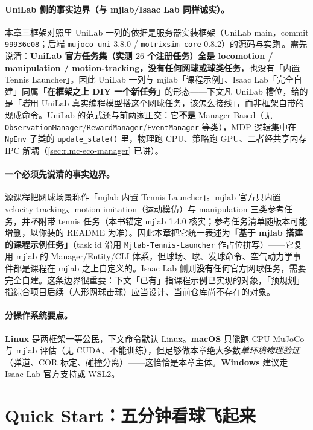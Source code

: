 \paragraph{UniLab 侧的事实边界（与 mjlab/Isaac Lab 同样诚实）。}本章三框架对照里 UniLab 一列的依据是服务器实装框架（UniLab main，commit \texttt{99936e08}；后端 \verb|mujoco-uni| 3.8.0 / \verb|motrixsim-core| 0.8.2）的源码与实跑\,\cite{unilab2026}。需先说清：\textbf{UniLab 官方任务集（实测 $26$ 个注册任务）全是 locomotion / manipulation / motion-tracking，没有任何网球或球类任务}，也没有「内置 Tennis Launcher」。因此 UniLab 一列与 mjlab「课程示例」、Isaac Lab「完全自建」同属\textbf{「在框架之上 DIY 一个新任务」}的形态——下文凡 UniLab 槽位，给的是「\emph{若}用 UniLab 真实编程模型搭这个网球任务，该怎么接线」，而非框架自带的现成命令。UniLab 的范式还与前两家正交：它\textbf{不是} Manager-Based（无 \verb|ObservationManager|/\verb|RewardManager|/\verb|EventManager| 等类），MDP 逻辑集中在 \verb|NpEnv| 子类的 \verb|update_state()| 里，物理跑 CPU、策略跑 GPU、二者经共享内存 IPC 解耦（\cref{sec:rlmc-eco-manager} 已讲）。

\paragraph{一个必须先说清的事实边界。}源课程把网球场景称作「mjlab 内置 Tennis Launcher」。mjlab 官方只内置 velocity tracking、motion imitation（运动模仿）与 manipulation 三类参考任务，并\emph{不}附带 tennis 任务（本书锚定 mjlab 1.4.0 核实；参考任务清单随版本可能增删，以你装的 README 为准）。因此本章把它统一表述为\textbf{「基于 mjlab 搭建的课程示例任务」}（task id 沿用 \verb|Mjlab-Tennis-Launcher| 作占位拼写）——它复用 mjlab 的 Manager/Entity/CLI 体系，但球场、球、发球命令、空气动力学事件都是课程在 mjlab 之上自定义的。Isaac Lab 侧则\textbf{没有}任何官方网球任务，需要完全自建。这条边界很重要：下文「已有」指课程示例已实现的对象，「预规划」指综合项目后续（人形网球击球）应当设计、当前仓库尚不存在的对象。

\paragraph{分操作系统要点。}\textbf{Linux} 是两框架一等公民，下文命令默认 Linux。\textbf{macOS} 只能跑 CPU MuJoCo 与 mjlab 评估（无 CUDA、不能训练），但足够做本章绝大多数\emph{单环境物理验证}（弹道、COR 标定、碰撞分离）——这恰恰是本章主体。\textbf{Windows} 建议走 Isaac Lab 官方支持或 WSL2。

\section*{Quick Start：五分钟看球飞起来}
\label{sec:rlmc-tennis-quickstart}

